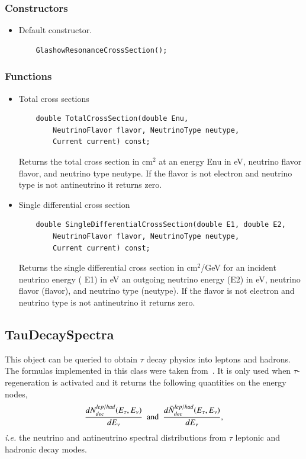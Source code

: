 \documentclass[3p,12pt]{elsarticle}
\newcommand{\ttf}{\ttfamily}
\begin{document}
\subsubsection{Constructors}

\begin{itemize}
\item Default constructor.
  \begin{lstlisting}
    GlashowResonanceCrossSection();
  \end{lstlisting}
\end{itemize}

\subsubsection{Functions}

\begin{itemize}
\item Total cross sections
  \begin{lstlisting}
    double TotalCrossSection(double Enu,
    	NeutrinoFlavor flavor, NeutrinoType neutype,
    	Current current) const;
  \end{lstlisting}
     Returns the total cross section in cm$^2$ at an energy {\ttf Enu} in eV, neutrino flavor {\ttf flavor}, and neutrino type {\ttf neutype}.
     If the flavor is not electron and neutrino type is not antineutrino it returns zero.
\item Single differential cross section
  \begin{lstlisting}
    double SingleDifferentialCrossSection(double E1, double E2,
    	NeutrinoFlavor flavor, NeutrinoType neutype,
    	Current current) const;
  \end{lstlisting}
  Returns the single differential cross section in cm$^2$/GeV for an incident neutrino energy ({\ttf
    E1}) in eV an outgoing neutrino energy ({\ttf E2}) in eV, neutrino flavor ({\ttf flavor}),
  and neutrino type ({\ttf neutype}).
     If the flavor is not electron and neutrino type is not antineutrino it returns zero.
\end{itemize}

\subsection{TauDecaySpectra\label{sec:tau_decay_spectra}}

This object can be queried to obtain $\tau$ decay physics into leptons
and hadrons. The formulas implemented in this class were taken
from~\citep{Dutta:2000jv}. It is only used when $\tau$-regeneration is
activated and it returns the following quantities on the energy
nodes, 
\begin{equation}
\frac{dN^{lep/had}_{dec} (E_\tau, E_\nu)}{dE_\nu} {\rm ~~and~~ }
\frac{d\bar{N}^{lep/had}_{dec} (E_\tau, E_\nu)}{dE_\nu},
\label{eqn:tau-dist}
\end{equation}
{\it i.e.} the neutrino and antineutrino spectral distributions from $\tau$
leptonic and hadronic decay modes.
\end{document}
